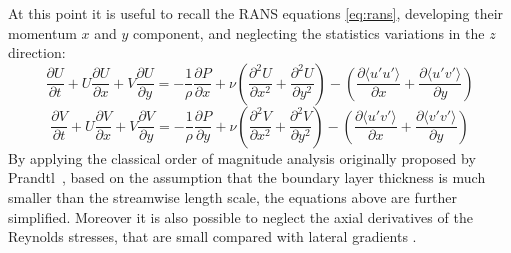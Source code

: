 \documentclass[12pt, a4paper, twoside, openright]{book}
\begin{document}
At this point it is useful to recall the RANS equations \eqref{eq:rans}, developing their momentum $x$ and $y$ component, and neglecting the statistics variations in the $z$ direction:
\begin{equation}
	\frac{\partial U}{\partial t} + U \frac{\partial U}{\partial x} + V \frac{\partial U}{\partial y} =
	-\frac{1}{\rho} \frac{\partial P}{\partial x}
	+ \nu \left( \frac{\partial^2 U}{\partial x^2} + \frac{\partial^2 U}{\partial y^2} \right)
	- \left( \frac{\partial \langle u'u' \rangle}{\partial x} + \frac{\partial \langle u'v' \rangle}{\partial y} \right)
	\label{eq:rans-wall-x}
\end{equation}
\begin{equation}
	\frac{\partial V}{\partial t} + U \frac{\partial V}{\partial x} + V \frac{\partial V}{\partial y} =
	-\frac{1}{\rho} \frac{\partial P}{\partial y}
	+ \nu \left( \frac{\partial^2 V}{\partial x^2} + \frac{\partial^2 V}{\partial y^2} \right)
	- \left( \frac{\partial \langle u'v' \rangle}{\partial x} + \frac{\partial \langle v'v' \rangle}{\partial y} \right)
	\label{eq:rans-wall-y}
\end{equation}
By applying the classical order of magnitude analysis originally proposed by Prandtl~\cite{prandtl-dimensional-analysis}, based on the assumption that the boundary layer thickness is much smaller than the streamwise length scale, the equations above are further simplified. Moreover it is also possible to neglect the axial derivatives of the Reynolds stresses, that are small compared with lateral gradients \cite{turbulent-flows}. %
\end{document}
